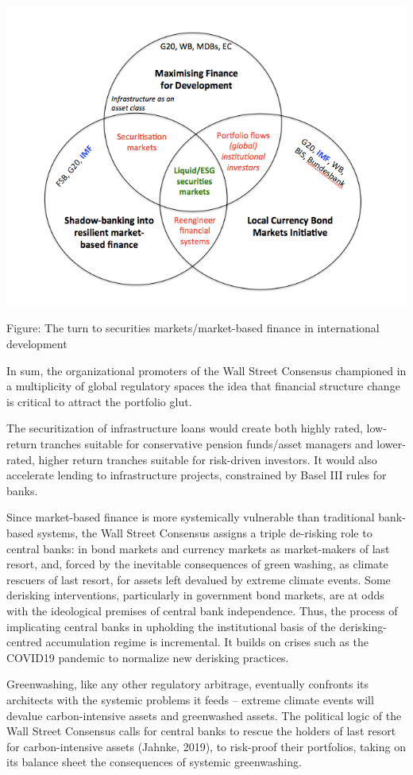 \documentclass[
]{book}
\begin{document}
\includegraphics{fig/new_development_finance.png}

Figure: The turn to securities markets/market-based finance in international development

In sum, the organizational promoters of the Wall Street
Consensus championed in a multiplicity of global regulatory spaces the idea that
financial structure change is critical to attract the portfolio glut.

The
securitization of infrastructure loans would create both highly rated, low-return
tranches suitable for conservative pension funds/asset managers and lower-rated,
higher return tranches suitable for risk-driven investors. It would also accelerate lending
to infrastructure projects, constrained by Basel III rules for banks.

Since market-based finance is more systemically vulnerable than traditional bank-based
systems, the Wall Street Consensus assigns a triple de-risking role to central banks: in
bond markets and currency markets as market-makers of last resort,
and, forced by the inevitable consequences of green washing, as climate rescuers of last
resort, for assets left devalued by extreme climate events.
Some derisking
interventions, particularly in government bond markets, are at odds with the ideological
premises of central bank independence. Thus, the process of implicating central banks
in upholding the institutional basis of the derisking-centred accumulation regime is
incremental. It builds on crises such as the COVID19 pandemic to normalize new
derisking practices.

Greenwashing, like any
other regulatory arbitrage, eventually confronts its architects with the systemic
problems it feeds -- extreme climate events will devalue carbon-intensive assets and
greenwashed assets. The political logic of the Wall Street Consensus calls for central
banks to rescue the holders of last resort for carbon-intensive assets (Jahnke, 2019), to
risk-proof their portfolios, taking on its balance sheet the consequences of systemic
greenwashing.
\end{document}

